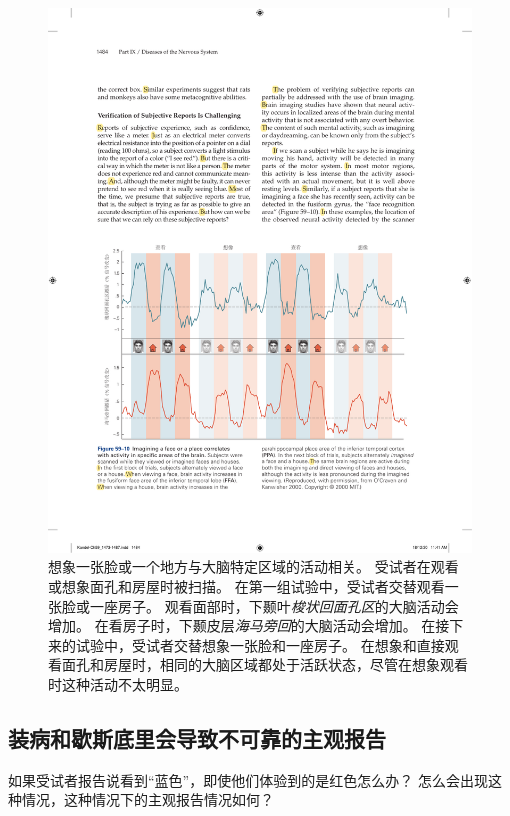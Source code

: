 \begin{figure}[htbp]
	\centering
	\includegraphics[width=1.0\linewidth]{chap59/fig_59_10}
	\caption{想象一张脸或一个地方与大脑特定区域的活动相关。
		受试者在观看或想象面孔和房屋时被扫描。
		在第一组试验中，受试者交替观看一张脸或一座房子。
		观看面部时，下颞叶\textit{梭状回面孔区}的大脑活动会增加。
		在看房子时，下颞皮层\textit{海马旁回}的大脑活动会增加。
		在接下来的试验中，受试者交替想象一张脸和一座房子。
		在想象和直接观看面孔和房屋时，相同的大脑区域都处于活跃状态，尽管在想象观看时这种活动不太明显\cite{o2000mental}。}
	\label{fig:59_10}
\end{figure}



\subsection{装病和歇斯底里会导致不可靠的主观报告}

如果受试者报告说看到“蓝色”，即使他们体验到的是红色怎么办？
怎么会出现这种情况，这种情况下的主观报告情况如何？


